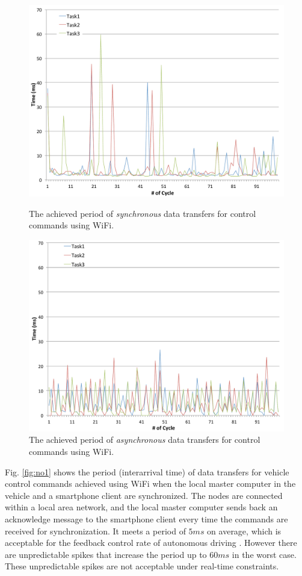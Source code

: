 \begin{figure}[!t]
 \centering
 \includegraphics[width=0.75\hsize]{fig/No1_Andrive_serv_cycle_WiFi.pdf}
 \caption{The achieved period of \textit{synchronous} data transfers for
 control commands using WiFi.}
 \label{fig:no1}
 \vspace{1em}
 \includegraphics[width=0.75\hsize]{fig/No4_Andrive_serv_cycle_WiFi_only_send.pdf}
 \caption{The achieved period of \textit{asynchronous} data transfers
 for control commands using WiFi.}
 \label{fig:no4}
\end{figure}

Fig. \ref{fig:no1} shows the period (interarrival time) of data
transfers for vehicle control commands achieved using WiFi when the
local master computer in the vehicle and a smartphone client are
synchronized.
The nodes are connected within a local area network, and the local
master computer sends back an acknowledge message to the smartphone
client every time the commands are received for synchronization.
It meets a period of $5ms$ on average, which is acceptable for the
feedback control rate of autonomous driving \cite{Kagami13}.
However there are unpredictable spikes that increase the period up to
$60ms$ in the worst case.
These unpredictable spikes are not acceptable under real-time
constraints.


